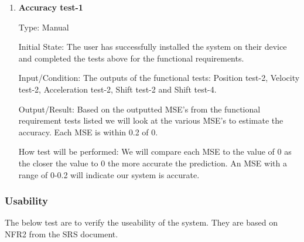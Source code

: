 \documentclass[12pt, titlepage]{article}
\begin{document}
\begin{enumerate}
  \item {} \hypertarget{Accuracy test-1}{\textbf{Accuracy test-1}} \label{Accuracy test-1}


Type: Manual
					
Initial State: The user has successfully installed the system on their device and completed the tests above for the functional requirements.
					
Input/Condition: The outputs of the functional tests: Position test-2, Velocity test-2, Acceleration test-2, Shift test-2 and Shift test-4. 
					
Output/Result: Based on the outputted MSE's from the functional requirement tests listed we will look at the various MSE's to estimate the accuracy. 
Each MSE is within 0.2 of 0.
					
How test will be performed: We will compare each MSE to the value of 0 as the closer the value to 0 the more accurate the prediction. An MSE with a range of 0-0.2 will indicate our system is accurate.

\end{enumerate}

\subsubsection{Usability}

The below test are to verify the useability of the system.
They are based on NFR2 from the SRS document.
\end{document}
